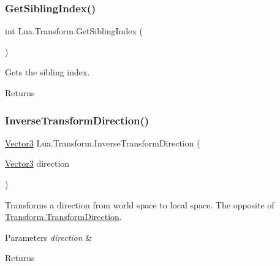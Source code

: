 \subsubsection{\texorpdfstring{GetSiblingIndex()}{GetSiblingIndex()}}
{\footnotesize\ttfamily int Lua.\+Transform.\+Get\+Sibling\+Index (\begin{DoxyParamCaption}{ }\end{DoxyParamCaption})}



Gets the sibling index. 

\begin{DoxyReturn}{Returns}

\end{DoxyReturn}
\mbox{\label{class_lua_1_1_transform_a7bf8b1d272b1d893a606c5f38770c433}} 
\subsubsection{\texorpdfstring{InverseTransformDirection()}{InverseTransformDirection()}\hspace{0.1cm}{\footnotesize\ttfamily [1/2]}}
{\footnotesize\ttfamily \mbox{\hyperlink{class_lua_1_1_vector3}{Vector3}} Lua.\+Transform.\+Inverse\+Transform\+Direction (\begin{DoxyParamCaption}\item[{\mbox{\hyperlink{class_lua_1_1_vector3}{Vector3}}}]{direction }\end{DoxyParamCaption})}



Transforms a direction from world space to local space. The opposite of \mbox{\hyperlink{class_lua_1_1_transform_a14270ac6dbade453decf26513f533b66}{Transform.\+Transform\+Direction}}. 


\begin{DoxyParams}{Parameters}
{\em direction} & \\
\hline
\end{DoxyParams}
\begin{DoxyReturn}{Returns}

\end{DoxyReturn}
\mbox{\label{class_lua_1_1_transform_a4983e88de730e650bb632f63d043035f}} 
